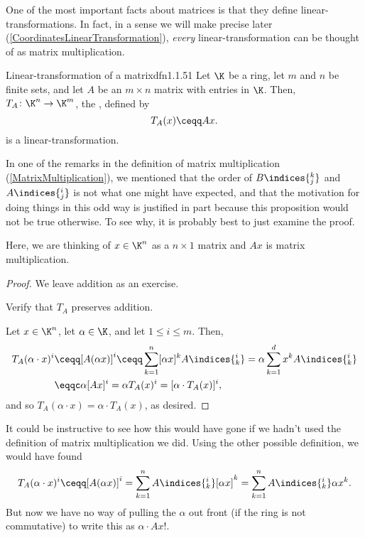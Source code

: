 One of the most important facts about matrices is that they define linear-transformations.  In fact, in a sense we will make precise later (\cref{CoordinatesLinearTransformation}), \emph{every} linear-transformation can be thought of as matrix multiplication.
\begin{prp}{Linear-transformation of a matrix}{dfn1.1.51}
	Let $\K$ be a ring, let $m$ and $n$ be finite sets, and let $A$ be an $m\times n$ matrix with entries in $\K$.  Then, $T_A\colon \K ^n\rightarrow \K ^m$, the , defined by
	\begin{equation}
	T_A(x)\ceqq Ax.
	\end{equation}
	is a linear-transformation.
	\begin{rmk}
		In one of the remarks in the definition of matrix multiplication (\cref{MatrixMultiplication}), we mentioned that the order of $B\indices{^k_j}$ and $A\indices{^i_j}$ is not what one might have expected, and that the motivation for doing things in this odd way is justified in part because this proposition would not be true otherwise.  To see why, it is probably best to just examine the proof.
	\end{rmk}
	\begin{rmk}
		Here, we are thinking of $x\in \K ^n$ as a $n\times 1$ matrix and $Ax$ is matrix multiplication.
	\end{rmk}
	\begin{proof}
		We leave addition as an exercise.
		\begin{exr}[breakable=false]{}{}
			Verify that $T_A$ preserves addition.
		\end{exr}
		
		Let $x\in \K ^n$, let $\alpha \in \K$, and let $1\leq i\leq m$.  Then,
		\begin{equation}
		\begin{split}
		T_A(\alpha \cdot x)^i & \ceqq [A(\alpha x)]^i\ceqq \sum _{k=1}^n[\alpha x]^kA\indices{^i_k}=\alpha \sum _{k=1}^dx^kA\indices{^i_k} \\
		& \eqqc \alpha [Ax]^i=\alpha T_A(x)^i=[\alpha \cdot T_A(x)]^i,
		\end{split}
		\end{equation}
		and so $T_A(\alpha \cdot x)=\alpha \cdot T_A(x)$, as desired.
	\end{proof}
	\begin{rmk}
		It could be instructive to see how this would have gone if we hadn't used the definition of matrix multiplication we did.  Using the other possible definition, we would have found
		\begin{equation}
		T_A(\alpha \cdot x)^i\ceqq [A(\alpha x)]^i=\sum _{k=1}^nA\indices{^i_k}[\alpha x]^k=\sum _{k=1}^nA\indices{^i_k}\alpha x^k.
		\end{equation}
		But now we have no way of pulling the $\alpha$ out front (if the ring is not commutative) to write this as $\alpha \cdot Ax$!.
	\end{rmk}
\end{prp}
